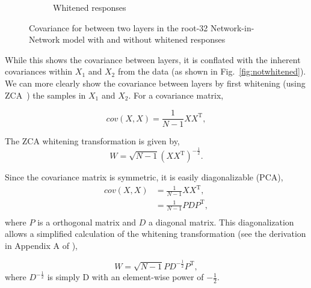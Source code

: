 \documentclass[thesis]{subfiles}
\begin{document}
\begin{figure}[tbp]
\begin{subfigure}[b]{0.45\linewidth}
			\caption{Whitened responses}
			\label{fig:whitened}
		\end{subfigure}
		\caption{Covariance for between two layers in the root-32 Network-in-Network model with and without whitened responses}
		\label{fig:whitevsnot}
	\end{figure}
	
	While this shows the covariance between layers, it is conflated with the inherent covariances within $X_1$ and $X_2$ from the data (as shown in Fig.~\ref{fig:notwhitened}). We can more clearly show the covariance between layers by first whitening (using ZCA~\cite{CIFAR10}) the samples in $X_1$ and $X_2$. For a covariance matrix,
	
	\begin{equation}
	cov(X, X) = \frac{1}{N-1} XX^\textrm{T},
	\end{equation}
	
	The ZCA whitening transformation is given by,
	\begin{equation}
	W = \sqrt{N-1}\left(XX^\textrm{T}\right)^{-\frac{1}{2}}.
	\end{equation}
	
	Since the covariance matrix is symmetric, it is easily diagonalizable (\ie PCA),
	\begin{align}
	cov(X, X) &= \frac{1}{N-1} XX^\textrm{T},\\
	&=\frac{1}{N-1} PDP^\textrm{T},\\
	\end{align}
	where $P$ is a orthogonal matrix and $D$ a diagonal matrix. This diagonalization allows a simplified calculation of the whitening transformation (see the derivation in Appendix A of \cite{CIFAR10}),
	
	\begin{equation}
	W = \sqrt{N-1}PD^{-\frac{1}{2}}P^\textrm{T},
	\end{equation}
	where $D^{-\frac{1}{2}}$ is simply D with an element-wise power of $-\frac{1}{2}$.
	
\end{document}
